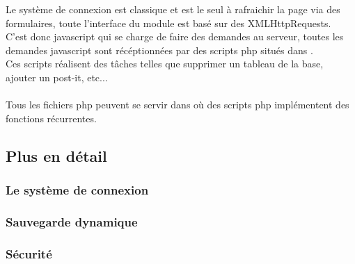 \documentclass[a4paper, 11pt]{article}
\begin{document}
Le système de connexion est classique et est le seul à rafraichir la page via des formulaires,
toute l'interface du module  est basé sur des XMLHttpRequests. \\
C'est donc javascript qui se charge de faire des demandes au serveur, 
toutes les demandes javascript sont récéptionnées par des scripts php situés dans .
\\
Ces scripts réalisent des tâches telles que supprimer un tableau de la base, ajouter un post-it, etc...
\\ \\

Tous les fichiers php peuvent se servir dans  où des scripts php implémentent des fonctions
récurrentes.

\subsection{Plus en détail}

\subsubsection{Le système de connexion}

\subsubsection{Sauvegarde dynamique}

\subsubsection{Sécurité}
\end{document}
